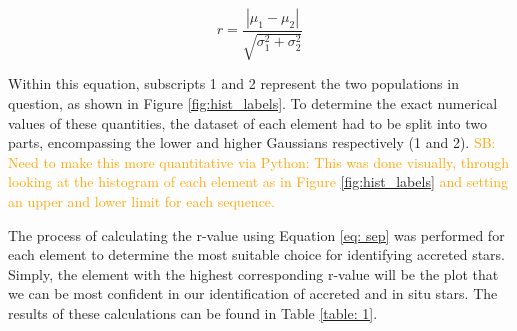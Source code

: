 \documentclass[fleqn,usenatbib]{mnras}
\newcommand{\SB}[1]{{\textcolor{orange}{SB: #1}}}
\begin{document}
\begin{equation} \label{eq: sep}
r = \frac{|\mu_1 - \mu_2|}{\sqrt{\sigma_1^2 + \sigma_2^2}}
\end{equation}

Within this equation, subscripts 1 and 2 represent the two populations in question, as shown in Figure \ref{fig:hist_labels}. To determine the exact numerical values of these quantities, the dataset of each element had to be split into two parts, encompassing the lower and higher Gaussians respectively (1 and 2). \SB{Need to make this more quantitative via Python: This was done visually, through looking at the histogram of each element as in Figure \ref{fig:hist_labels} and setting an upper and lower limit for each sequence.} 



 The process of calculating the r-value using Equation \ref{eq: sep} was performed for each element to determine the most suitable choice for identifying accreted stars. Simply, the element with the highest corresponding r-value will be the plot that we can be most confident in our identification of accreted and in situ stars. The results of these calculations can be found in Table \ref{table: 1}. 


\end{document}
